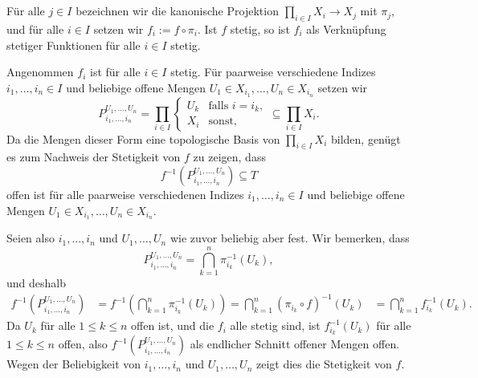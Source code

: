 \documentclass[a4paper,10pt]{article}
\begin{document}
\section{}

Für alle $j \in I$ bezeichnen wir die kanonische Projektion $\prod_{i \in I} X_i \to X_j$ mit $\pi_j$, und für alle $i \in I$ setzen wir $f_i := f \circ \pi_i$. Ist $f$ stetig, so ist $f_i$ als Verknüpfung stetiger Funktionen für alle $i \in I$ stetig.

Angenommen $f_i$ ist für alle $i \in I$ stetig. Für paarweise verschiedene Indizes $i_1, \ldots, i_n \in I$ und beliebige offene Mengen $U_1 \in X_{i_1}, \ldots, U_n \in X_{i_n}$ setzen wir
\[
 P_{i_1, \ldots, i_n}^{U_1, \ldots, U_n}
 = \prod_{i \in I} \begin{cases} U_k & \text{falls } i = i_k, \\ X_i & \text{sonst}, \end{cases}
 \subseteq \prod_{i \in I} X_i.
\]
Da die Mengen dieser Form eine topologische Basis von $\prod_{i \in I} X_i$ bilden, genügt es zum Nachweis der Stetigkeit von $f$ zu zeigen, dass
\[
 f^{-1}\left(P_{i_1, \ldots, i_n}^{U_1, \ldots, U_n}\right) \subseteq T
\]
offen ist für alle paarweise verschiedenen Indizes $i_1, \ldots, i_n \in I$ und beliebige offene Mengen $U_1 \in X_{i_1}, \ldots, U_n \in X_{i_n}$.

Seien also $i_1, \ldots, i_n$ und $U_1, \ldots, U_n$ wie zuvor beliebig aber fest. Wir bemerken, dass
\[
 P_{i_1, \ldots, i_n}^{U_1, \ldots, U_n} = \bigcap_{k=1}^n \pi_{i_k}^{-1}(U_k),
\]
und deshalb
\begin{align*}
 f^{-1}\left(P_{i_1, \ldots, i_n}^{U_1, \ldots, U_n}\right)
 &= f^{-1}\left(\bigcap_{k=1}^n \pi_{i_k}^{-1}(U_k)\right)
 = \bigcap_{k=1}^n (\pi_{i_k} \circ f)^{-1}(U_k)
 &= \bigcap_{k=1}^n f_{i_k}^{-1}(U_k).
\end{align*}
Da $U_k$ für alle $1 \leq k \leq n$ offen ist, und die $f_i$ alle stetig sind, ist $f_{i_k}^{-1}(U_k)$ für alle $1 \leq k \leq n$ offen, also $f^{-1}(P_{i_1, \ldots, i_n}^{U_1, \ldots, U_n})$ als endlicher Schnitt offener Mengen offen. Wegen der Beliebigkeit von $i_1, \ldots, i_n$ und $U_1, \ldots, U_n$ zeigt dies die Stetigkeit von $f$.
\end{document}
